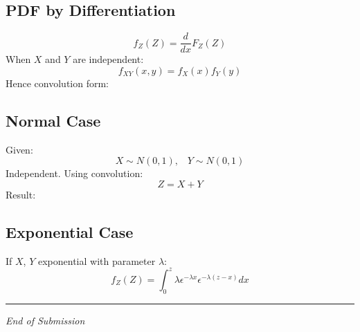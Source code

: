 \documentclass[11pt]{article}
\begin{document}
\subsection{PDF by Differentiation}
$$f_Z(Z) = \dfrac{d}{dx}F_Z(Z)$$
When $X$ and $Y$ are independent:
$$f_{XY}(x, y) = f_X(x)f_Y(y)$$
Hence convolution form:
\begin{center}
\end{center}
\subsection{Normal Case}
Given:
$$
X \sim N(0, 1),\;\;\;Y \sim N(0, 1)
$$
Independent.
Using convolution:
$$
Z = X + Y
$$
Result:
\begin{center}
\end{center}
\subsection{Exponential Case}
If $X$, $Y$ exponential with parameter $\lambda$:
$$
f_Z(Z) = \int_{0}^{z}\lambda\epsilon^{-\lambda x}\epsilon^{-\lambda(z-x)}dx
$$

\vfill
\bigskip
\hrule
\vspace{0.2cm}
\begin{center}
\small \textit{End of Submission}
\end{center}
\end{document}
